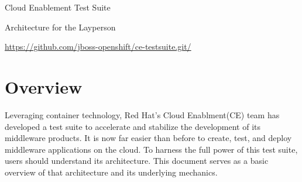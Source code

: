 \documentclass{article}
\begin{document}
      
\centerline{\sc \large Cloud Enablement Test Suite}
\centerline{\sc Architecture for the Layperson }
\centerline{\url{https://github.com/jboss-openshift/ce-testsuite.git/}}

\vspace{1pc}
\section{Overview}

\hspace{3pc} Leveraging container technology, Red Hat's Cloud Enablment(CE) team has developed a test suite to accelerate 
and stabilize the development of its middleware products. It is now far easier than before to create, test, and deploy 
middleware applications on the cloud. To harness the full power of this test suite, users should understand its architecture. 
This document serves as a basic overview of that architecture and its underlying mechanics.
\end{document}
